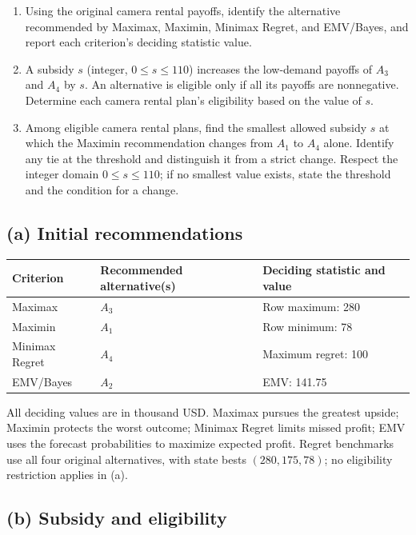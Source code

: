 \begin{enumerate}[label=\textbf{(\alph*)},leftmargin=*]
	\item Using the original camera rental payoffs, identify the alternative recommended by Maximax, Maximin, Minimax Regret, and EMV/Bayes, and report each criterion's deciding statistic value. 

	\item A subsidy $s$ (integer, $0\leq s\leq110$) increases the low-demand payoffs of $A_3$ and $A_4$ by $s$. An alternative is eligible only if all its payoffs are nonnegative. Determine each camera rental plan's eligibility based on the value of $s$. 

	\item Among eligible camera rental plans, find the smallest allowed subsidy $s$ at which the Maximin recommendation changes from $A_1$ to $A_4$ alone. Identify any tie at the threshold and distinguish it from a strict change. Respect the integer domain $0\leq s\leq110$; if no smallest value exists, state the threshold and the condition for a change. 
\end{enumerate}
\label{sol:q1a}
\subsection*{(a) Initial recommendations }
\begin{center}
\begin{tabular}{lll}\toprule
Criterion & Recommended alternative(s) & Deciding statistic and value\\ \midrule
		Maximax & $A_3$ & Row maximum: 280\\
		Maximin & $A_1$ & Row minimum: 78\\
		Minimax Regret & $A_4$ & Maximum regret: 100\\
		EMV/Bayes & $A_2$ & EMV: 141.75\\
		\bottomrule\end{tabular}
\end{center}
All deciding values are in thousand USD. Maximax pursues the greatest upside; Maximin protects the worst outcome; Minimax Regret limits missed profit; EMV uses the forecast probabilities to maximize expected profit. Regret benchmarks use all four original alternatives, with state bests $(280,175,78)$; no eligibility restriction applies in (a).
\secInicio[sec:q1]


\label{sol:q1b}
\subsection*{(b) Subsidy and eligibility }

